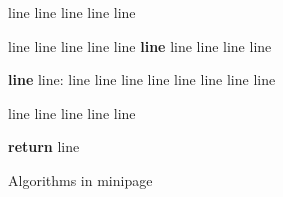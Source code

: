 \documentclass{article}
\begin{document}
\begin{figure*}[tb]
  \begin{minipage}{0.56\textwidth}

  \vspace{-10px}
  \begin{algorithm}[H]
    \caption{Algorithms in minipage}
    \label{alg:main}
  \begin{algorithmic}[1]
    \REQUIRE line
    \STATE line
    \STATE line
    \STATE line
    \STATE line


      \STATE line
      \STATE line
    \ENDFOR
    \STATE
    \STATE line
      \STATE line
        \STATE line
        \STATE \textbf{line}
        \STATE \hspace{16px} line
        \STATE \hspace{16px} line
        \STATE \hspace{16px} line
        \STATE \hspace{16px} line

        \STATE \textbf{line} line:
        \STATE \hspace{16px} line
        \STATE \hspace{16px} line
        \STATE \hspace{16px} line
        \STATE \hspace{16px} line
        \STATE \hspace{16px} \hspace{16px} line
        \STATE \hspace{16px} \hspace{16px} line
        \STATE \hspace{16px} line
        \STATE \hspace{16px} line

      \ENDWHILE
      \STATE
      \STATE line
      \STATE line 
      \STATE line
      \STATE line
    \ENDWHILE
    \STATE
      \STATE line
    \ENDFOR

    \STATE \textbf{return} line

  \end{algorithmic}
  \end{algorithm}
  \vspace{-18px}
  \end{minipage}\hspace{8px}
  \begin{minipage}{0.42\textwidth}


\end{minipage}
\end{figure*}
\end{document}
